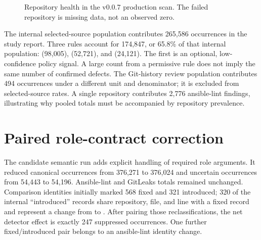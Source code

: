 \begin{figure}[htbp]
\centering
{}
\caption{Repository health in the v0.0.7 production scan. The failed
repository is missing data, not an observed zero.}
\label{fig:v007_health}
\end{figure}

The internal selected-source population contributes 265,586 occurrences in
the study report. Three rules account for 174,847, or 65.8\% of that internal
population:  (98,005), 
(52,721), and  (24,121). The first is an
optional, low-confidence policy signal. A large count from a permissive rule
does not imply the same number of confirmed defects. The Git-history review
population contributes 494 occurrences under a different unit and denominator;
it is excluded from selected-source rates. A single repository contributes
2,776  ansible-lint findings, illustrating why
pooled totals must be accompanied by repository prevalence.

\section{Paired role-contract correction}
The candidate semantic run adds explicit handling of required role arguments.
It reduced canonical occurrences from 376,271 to 376,024 and uncertain
occurrences from 54,443 to 54,196. Ansible-lint and GitLeaks totals remained
unchanged. Comparison identities initially marked 568 fixed and 321
introduced; 320 of the internal ``introduced'' records share repository,
file, and line with a fixed record and represent a change from
 to . After
pairing those reclassifications, the net detector effect is exactly 247
suppressed  occurrences. One further fixed/introduced
pair belongs to an ansible-lint  identity change.

